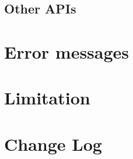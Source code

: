 \documentclass[12pt,a4paper,dvipdfmx]{book} %
\begin{document}
\section{Other APIs}
\label{sec:other_APIs}

\newpage

\chapter{Error messages}
\label{chap:error_messages}

\newpage

\chapter{Limitation}
\label{chap:limitation}

\newpage

\chapter{Change Log}
\label{chap:change_log}


\printindex
\end{document}
